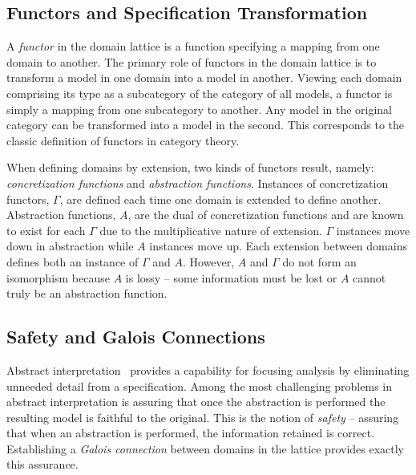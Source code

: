 \documentclass[12pt]{article}
\begin{document}
\subsection{Functors and Specification Transformation}


A \emph{functor} in the domain lattice is a function specifying a
mapping from one domain to another.  The primary role of functors in
the domain lattice is to transform a model in one domain into a model
in another.  Viewing each domain comprising its type as a subcategory
of the category of all models, a functor is simply a mapping from one
subcategory to another.  Any model in the original category can be
transformed into a model in the second.  This corresponds to the
classic definition of functors in category theory.


When defining domains by extension, two kinds of functors result,
namely: \emph{concretization functions} and \emph{abstraction
  functions}.  Instances of concretization functors, $\Gamma$, are
defined each time one domain is extended to define another.
Abstraction functions, $A$, are the dual of concretization functions
and are known to exist for each $\Gamma$ due to the multiplicative
nature of extension.  $\Gamma$ instances move down in abstraction
while $A$ instances move up.  Each extension between domains defines
both an instance of $\Gamma$ and $A$.  However, $A$ and $\Gamma$ do
not form an isomorphism because $A$ is lossy -- some information must
be lost or $A$ cannot truly be an abstraction function.

\subsection{Safety and Galois Connections}

Abstract interpretation~\cite{Cousot:00:Abstract-Interp} provides a
capability for focusing analysis by eliminating unneeded detail from a
specification.  Among the most challenging problems in abstract
interpretation is assuring that once the abstraction is performed the
resulting model is faithful to the original. This is the notion of
\emph{safety} -- assuring that when an abstraction is performed, the
information retained is correct.  Establishing a \emph{Galois
  connection} \cite{Nielson:05:Principles-of-P} between domains in the
lattice provides exactly this assurance.
\end{document}
